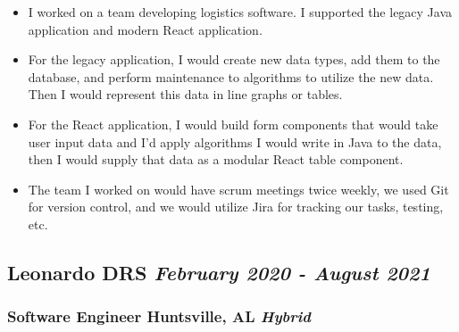 \documentclass{article}
\begin{document}
\begin{itemize}
    \item I worked on a team developing logistics software. I supported
     the legacy Java application and modern React application.
    \item For the legacy application, I would create new data types, add 
    them to the database, and perform maintenance to algorithms to utilize 
    the new data. Then I would represent this data in line graphs or tables.
    \item For the React application, I would build form components that
    would take user input data and I'd apply algorithms I would write in Java 
    to the data, then I would supply that data as a modular React table component.
    \item The team I worked on would have scrum meetings twice weekly, we used
    Git for version control, and we would utilize Jira for tracking our tasks, 
    testing, etc.
\end{itemize}

\subsection*{\hspace*{0.15cm} Leonardo DRS \hfill \textit{February 2020 - August 2021}}

\subsubsection*{\hspace*{0.15cm} Software Engineer \hfill Huntsville, AL \textit{Hybrid}}
\end{document}
